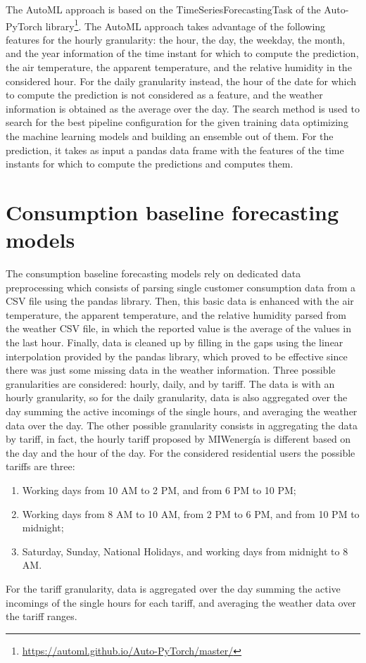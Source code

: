 The AutoML approach is based on the TimeSeriesForecastingTask of the Auto-PyTorch library\footnote{ \url{https://automl.github.io/Auto-PyTorch/master/} }.
The AutoML approach takes advantage of the following features for the hourly granularity: the hour, the day, the weekday, the month, and the year information of the time instant for which to compute the prediction, the air temperature, the apparent temperature, and the relative humidity in the considered hour.
For the daily granularity instead, the hour of the date for which to compute the prediction is not considered as a feature, and the weather information is obtained as the average over the day.
The search method is used to search for the best pipeline configuration for the given training data optimizing the machine learning models and building an ensemble out of them.
For the prediction, it takes as input a pandas data frame with the features of the time instants for which to compute the predictions and computes them.


\section{Consumption baseline forecasting models}
\label{sec:baselineimpl}
\vspace{0.2 cm}

The consumption baseline forecasting models rely on dedicated data preprocessing which consists of parsing single customer consumption data from a CSV file using the pandas library.
Then, this basic data is enhanced with the air temperature, the apparent temperature, and the relative humidity parsed from the weather CSV file, in which the reported value is the average of the values in the last hour.
Finally, data is cleaned up by filling in the gaps using the linear interpolation provided by the pandas library, which proved to be effective since there was just some missing data in the weather information.
Three possible granularities are considered: hourly, daily, and by tariff.
The data is with an hourly granularity, so for the daily granularity, data is also aggregated over the day summing the active incomings of the single hours, and averaging the weather data over the day.
The other possible granularity consists in aggregating the data by tariff, in fact, the hourly tariff proposed by MIWenergía is different based on the day and the hour of the day.
For the considered residential users the possible tariffs are three:
\begin{enumerate}
  \item Working days from 10 AM to 2 PM, and from 6 PM to 10 PM;
  \item Working days from 8 AM to 10 AM, from 2 PM to 6 PM, and from 10 PM to midnight;
  \item Saturday, Sunday, National Holidays, and working days from midnight to 8 AM.
\end{enumerate}
For the tariff granularity, data is aggregated over the day summing the active incomings of the single hours for each tariff, and averaging the weather data over the tariff ranges.

